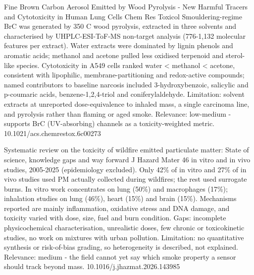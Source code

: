 \documentclass[10pt]{article}
\begin{document}
{Fine Brown Carbon Aerosol Emitted by Wood Pyrolysis - New Harmful Tracers and Cytotoxicity in Human Lung Cells}
{Chem Res Toxicol}
{Smouldering-regime BrC was generated by 350 C wood pyrolysis, extracted in three solvents and characterised by UHPLC-ESI-ToF-MS non-target analysis (776-1,132 molecular features per extract). Water extracts were dominated by lignin phenols and aromatic acids; methanol and acetone pulled less oxidised terpenoid and sterol-like species. Cytotoxicity in A549 cells ranked water < methanol < acetone, consistent with lipophilic, membrane-partitioning and redox-active compounds; named contributors to baseline narcosis included 3-hydroxybenzoic, salicylic and p-coumaric acids, benzene-1,2,4-triol and coniferylaldehyde. Limitation: solvent extracts at unreported dose-equivalence to inhaled mass, a single carcinoma line, and pyrolysis rather than flaming or aged smoke. Relevance: low-medium - supports BrC (UV-absorbing) channels as a toxicity-weighted metric.}
{10.1021/acs.chemrestox.6c00273}

{Systematic review on the toxicity of wildfire emitted particulate matter: State of science, knowledge gaps and way forward}
{J Hazard Mater}
{46 in vitro and in vivo studies, 2005-2025 (epidemiology excluded). Only 42\% of in vitro and 27\% of in vivo studies used PM actually collected during wildfires; the rest used surrogate burns. In vitro work concentrates on lung (50\%) and macrophages (17\%); inhalation studies on lung (46\%), heart (15\%) and brain (15\%). Mechanisms reported are mainly inflammation, oxidative stress and DNA damage, and toxicity varied with dose, size, fuel and burn condition. Gaps: incomplete physicochemical characterisation, unrealistic doses, few chronic or toxicokinetic studies, no work on mixtures with urban pollution. Limitation: no quantitative synthesis or risk-of-bias grading, so heterogeneity is described, not explained. Relevance: medium - the field cannot yet say which smoke property a sensor should track beyond mass.}
{10.1016/j.jhazmat.2026.143985}
\end{document}
